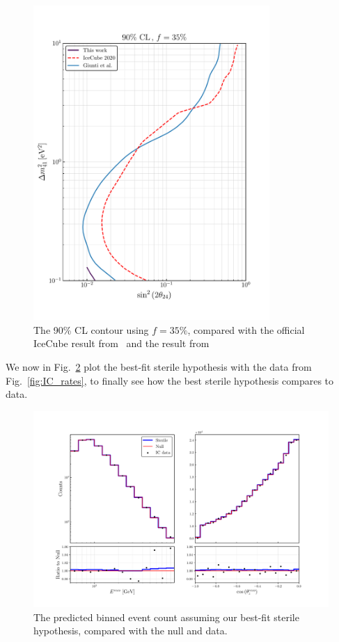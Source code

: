 \begin{figure}
    \centering
    \includegraphics[width=0.8\textwidth]{figures/s24_contour.pdf}
    \caption{The 90\% CL contour using $f=35\%$, compared with the official IceCube result from~\cite{IC2020}
    and the result from~\cite{gariazzoUpdatedGlobalAnalysis2017}}\label{fig:s24_contour}    
\end{figure} %

We now in Fig.~\ref{fig:final_rate_plot} plot the best-fit sterile hypothesis with the data from Fig.~\ref{fig:IC_rates}, to finally see how the best 
sterile hypothesis compares to data.
\begin{figure}
    \centering
    \includegraphics[width=1\textwidth]{figures/final_rate_plot.pdf}
    \caption{The predicted binned event count assuming our best-fit sterile hypothesis, compared with the 
    null and data.}\label{fig:final_rate_plot}
\end{figure}

%
